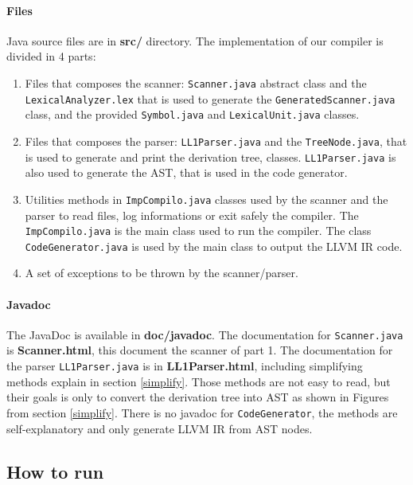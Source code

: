 \documentclass[letterpaper]{article}
\begin{document}
\paragraph{Files} Java source files are in \textbf{src/} directory.
The implementation of our compiler is divided in 4 parts:
\begin{enumerate}
    \item Files that composes the scanner: \texttt{Scanner.java} abstract
    class and the \texttt{LexicalAnalyzer.lex} that is used to generate
    the \texttt{GeneratedScanner.java} class, and
    the provided \texttt{Symbol.java} and \texttt{LexicalUnit.java} classes.
    \item Files that composes the parser: \texttt{LL1Parser.java}
    and the \texttt{TreeNode.java}, that is used to generate and print
    the derivation tree, classes. \texttt{LL1Parser.java} is also
    used to generate the AST, that is used in the code generator.
    \item Utilities methods in \texttt{ImpCompilo.java} classes
    used by the scanner and the parser to read
    files, log informations or exit safely the compiler. The
    \texttt{ImpCompilo.java} is the main class used to run the
    compiler. The class \texttt{CodeGenerator.java} is used by
    the main class to output the LLVM IR code.
    \item A set of exceptions to be thrown by the scanner/parser.
\end{enumerate}

\paragraph{Javadoc} The JavaDoc is available in \textbf{doc/javadoc}.
The documentation for \texttt{Scanner.java} is \textbf{Scanner.html},
this document the scanner of part 1.
The documentation for the parser
\texttt{LL1Parser.java} is in
\textbf{LL1Parser.html}, including simplifying methods explain in
section \ref{simplify}. Those methods are not easy to read, but their
goals is only to convert the derivation tree into AST as shown in Figures
from section \ref{simplify}. There is no javadoc for \texttt{CodeGenerator},
the methods are self-explanatory and only generate LLVM IR from AST
nodes.

\subsection{How to run}

\label{howto}
\end{document}
